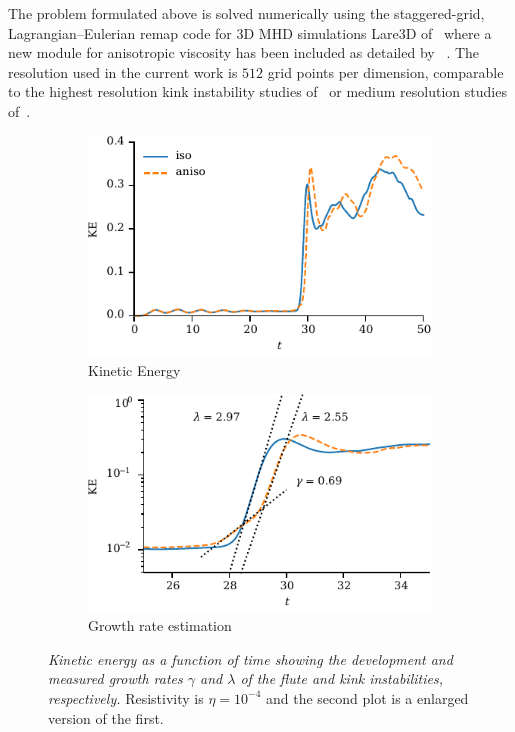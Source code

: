 \documentclass[fleqn,usenatbib]{mnras}
\newcommand{\revcite}[1]{{\color{red} \underline{#1}}}
\newcommand{\mycaption}[2]{\caption[#1]{\emph{#1} #2}}
\begin{document}
The problem formulated above is solved numerically using the staggered-grid,
Lagrangian–Eulerian remap code for 3D MHD simulations Lare3D
of~\cite{arberStaggeredGridLagrangian2001} where a  new module for anisotropic
viscosity has been included as detailed
by~\revcite{\citet{quinnKelvinHelmholtzInstabilityCollapse2021}}. The resolution used in
the current work is  $512$ grid points per dimension, comparable to the highest
resolution kink instability studies of~\cite{hoodCoronalHeatingMagnetic2009} or
medium resolution studies of~\cite{barefordShockHeatingNumerical2015}. 

\begin{figure}
  \centering
    \begin{subfigure}{0.49\textwidth}
      \includegraphics[width=\linewidth]{kinetic_energy-4.pdf}
      \caption{Kinetic Energy}
      \label{fig:kink_ke-4}
    \end{subfigure}
    \hfill
    \begin{subfigure}{0.49\textwidth}
      \includegraphics[width=\linewidth]{kinetic_energy_log-4.pdf}
      \caption{Growth rate estimation}
      \label{fig:kink_ke_log-4}
    \end{subfigure}
  \mycaption{Kinetic energy as a function of time showing the development and
  measured growth rates $\gamma$ and $\lambda$ of the flute and kink
  instabilities, respectively.}{Resistivity is $\eta=10^{-4}$ and the second
  plot is a enlarged version of the first.}
\label{fig:kink_str8_ke-4}%
\end{figure}
\end{document}
